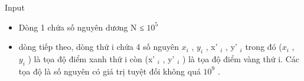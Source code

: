 Input
\begin{itemize}
	\item     Dòng 1 chứa số nguyên dương N ≤ $10^{5}$
	\item     dòng tiếp theo, dòng thứ i chứa 4 số nguyên $x_{i}$    , $y_{i}$    , x'    $_     i    $    , y'    $_     i    $    trong đó ($x_{i}$    , $y_{i}$    ) là tọa độ điểm xanh thứ i còn (x'    $_     i    $    , y'    $_     i    $    ) là tọa độ điểm vàng thứ i. Các tọa độ là số nguyên có giá trị tuyệt đối không quá $10^{9}$    .   
\end{itemize}